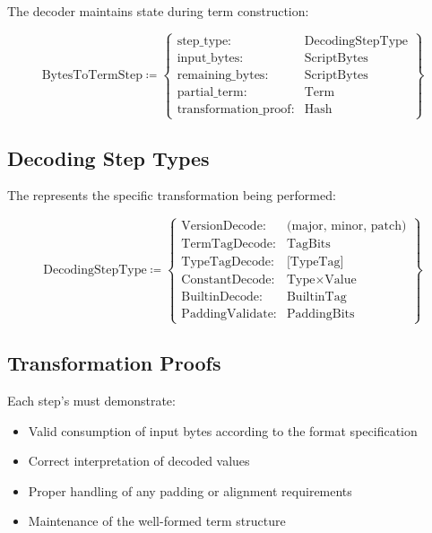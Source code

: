 \documentclass[../midgard.tex]{subfiles}
\begin{document}
The decoder maintains state during term construction:

\begin{equation*}
    \text{BytesToTermStep} \coloneq \left\{
    \begin{array}{ll}
        \text{step\_type} : & \text{DecodingStepType} \\
        \text{input\_bytes} : & \text{ScriptBytes} \\
        \text{remaining\_bytes} : & \text{ScriptBytes} \\
        \text{partial\_term} : & \text{Term} \\
        \text{transformation\_proof} : & \text{Hash}
    \end{array} \right\}
\end{equation*}

\subsection{Decoding Step Types}

The  represents the specific transformation being performed:

\begin{equation*}
    \text{DecodingStepType} \coloneq \left\{
    \begin{array}{ll}
        \text{VersionDecode} : & \text{(major, minor, patch)} \\
        \text{TermTagDecode} : & \text{TagBits} \\
        \text{TypeTagDecode} : & \text{[TypeTag]} \\
        \text{ConstantDecode} : & \text{Type} \times \text{Value} \\
        \text{BuiltinDecode} : & \text{BuiltinTag} \\
        \text{PaddingValidate} : & \text{PaddingBits}
    \end{array} \right\}
\end{equation*}

\subsection{Transformation Proofs}

Each step's  must demonstrate:

\begin{itemize}
    \item Valid consumption of input bytes according to the format specification
    \item Correct interpretation of decoded values
    \item Proper handling of any padding or alignment requirements
    \item Maintenance of the well-formed term structure
\end{itemize}
\end{document}
